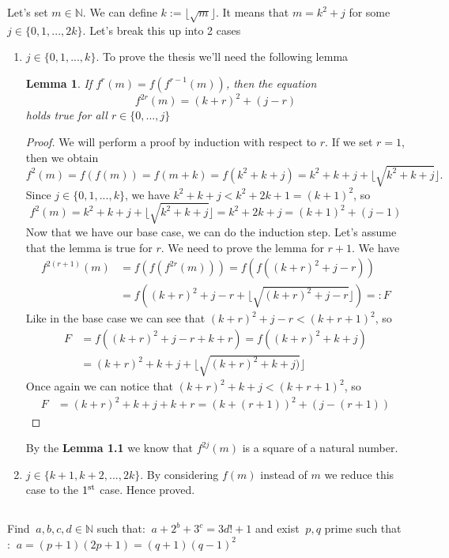\documentclass[12pt]{article}
\newtheorem{lemma}[theorem]{Lemma}
\begin{document}
\begin{flushleft}
Let's set $m\in\mathbb{N}$. We can define $k:=\lfloor\sqrt{m}\rfloor$. It means that $m=k^2+j$ for some $j\in\{0,1,...,2k\}$. Let's break this up into 2 cases\begin{enumerate}[label=\arabic*.]
\item $j\in\{0,1,...,k\}$. To prove the thesis we'll need the following lemma
\begin{lemma}
    If $f^{r}(m)=f(f^{r-1}(m))$, then the equation
    \[f^{2r}(m)=(k+r)^2+(j-r)\]
    holds true for all $r\in\{0,...,j\}$
\end{lemma}
\begin{proof}
    We will perform a proof by induction with respect to $r$. If we set $r=1$, then we obtain
    \[f^2(m)=f(f(m))=f(m+k)=f(k^2+k+j)=k^2+k+j+\lfloor\sqrt{k^2+k+j}\rfloor.\]
    Since $j\in\{0,1,...,k\}$, we have $k^2+k+j< k^2+2k+1=(k+1)^2$, so
    \[f^2(m)=k^2+k+j+\lfloor\sqrt{k^2+k+j}\rfloor=k^2+2k+j=(k+1)^2+(j-1)\]
    Now that we have our base case, we can do the induction step. Let's assume that the lemma is true for $r$. We need to prove the lemma for $r+1$. We have
    \begin{align*}
        f^{2(r+1)}(m)&=f(f(f^{2r}(m)))=f(f((k+r)^2+j-r))\\
        &=f((k+r)^2+j-r+\lfloor\sqrt{(k+r)^2+j-r}\rfloor)=:F
    \end{align*}
    Like in the base case we can see that $(k+r)^2+j-r<(k+r+1)^2$, so
    \begin{align*}
    F&=f((k+r)^2+j-r+k+r)=f((k+r)^2+k+j)\\
    &=(k+r)^2+k+j+\lfloor\sqrt{(k+r)^2+k+j)}\rfloor
    \end{align*}
    Once again we can notice that $(k+r)^2+k+j<(k+r+1)^2$, so
    \begin{align*}
    F&=(k+r)^2+k+j+k+r=(k+(r+1))^2+(j-(r+1))
    \end{align*}
\end{proof}
    By the \textbf{Lemma 1.1} we know that $f^{2j}(m)$ is a square of a natural number.
    \item $j\in\{k+1,k+2,...,2k\}$. By considering $f(m)$ instead of $m$ we reduce this case to the $1^{\textmd{st}}$ case. Hence proved.
    
\end{enumerate}
\end{flushleft}



\subsection*{}
Find $\ a,b,c,d \in \mathbb{N} $ such that: $\ a+2^{b}+3^{c}=3d!+1$
and exist $\ p,q $ prime such that :
$\ a=(p+1)(2p+1)=(q+1)(q-1)^2 $
\end{document}
